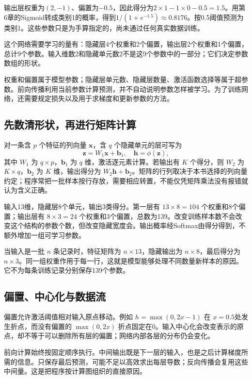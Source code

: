 输出层权重为$(2,-1)$、偏置为$-0.5$，因此得分为$2\times1-1\times0-0.5=1.5$。用第6章的Sigmoid转成类别1的概率，得到$1/(1+e^{-1.5})\approx0.8176$。按0.5阈值预测为类别1。这些参数只是为手算指定的，尚未通过任何真实数据训练。


这个网络需要学习的量有：隐藏层4个权重和2个偏置，输出层2个权重和1个偏置，总计9个参数。输入维数2和隐藏单元数2不是这9个参数中的一部分；它们决定参数数组的形状。

权重和偏置属于模型参数；隐藏层单元数、隐藏层数量、激活函数选择等属于超参数。前向传播利用当前参数计算预测，并不自动说明参数怎样被学习。为了训练网络，还需要规定损失以及用于求梯度和更新参数的方法。

\subsection{先数清形状，再进行矩阵计算}
对一条含 $p$ 个特征的列向量 $\mathbf x$，含 $q$ 个隐藏单元的层可写为
\[
\mathbf z=W_1\mathbf x+\mathbf b_1,\quad \mathbf h=\phi(\mathbf z),
\]
其中 $W_1$ 为 $q\times p$，$\mathbf b_1$ 为 $q$ 维，激活逐元素计算。若输出有 $K$ 个得分，则 $W_2$ 为 $K\times q$，$\mathbf b_2$ 为 $K$ 维，输出得分为 $W_2\mathbf h+\mathbf b_2$。矩阵的行列取决于本书选择的列向量约定；程序常把一批样本按行存放，需要相应转置，不能仅凭矩阵乘法没有报错就认为含义正确。

输入13维，隐藏层8个单元，输出3类得分。第一层有 $13\times8=104$ 个权重和8个偏置；输出层有 $8\times3=24$ 个权重和3个偏置，总数为139。改变训练样本数不会改变这个结构的参数个数，但改变隐藏宽度会。输出概率经Softmax由得分得到，不额外增加一组可学习参数。

当输入是一批 $n$ 条记录时，特征矩阵为 $n\times13$，隐藏输出为 $n\times8$，最后得分为 $n\times3$。同一组权重作用于每一行，这就是模型能够处理不同数量新样本的原因。它不为每条训练记录分别保存139个参数。

\subsection{偏置、中心化与数据流}
偏置允许激活阈值相对输入原点移动。例如 $h=\max(0,2x-1)$ 在 $x=0.5$处发生折点，而没有偏置的 $\max(0,2x)$ 折点固定在0。输入中心化会改变表示的原点，却不等于可以删除所有层的偏置；网络内部各层的分布仍会变化。

前向计算始终按固定顺序执行。中间输出既是下一层的输入，也是之后计算梯度所需的信息。只保存最后预测，可能不足以高效求出每层导数；反向传播会复用这些中间量。这是把程序按计算图组织的直接原因。

